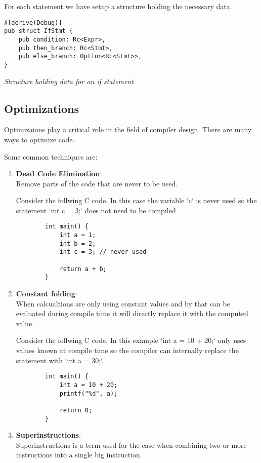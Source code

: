 \documentclass{article}
\begin{document}
For each statement we have setup a structure holding the necessary data.

\begin{verbatim}
#[derive(Debug)]
pub struct IfStmt {
    pub condition: Rc<Expr>,
    pub then_branch: Rc<Stmt>,
    pub else_branch: Option<Rc<Stmt>>,
}
\end{verbatim}
\textit{Structure holding data for an if statement}


\subsection{Optimizations} %
Optimizaions play a critical role in the field of compiler design. There are many
ways to optimize code.

Some common techniques are:
\begin{enumerate}
    \item \textbf{Dead Code Elimination}:\\
        Remove parts of the code that are never to be used.

        Consider the follwing C code. In this case the variable `c` is never
        used so the statement `int c = 3;` does not need to be compiled
        \begin{verbatim}
        int main() {
            int a = 1;
            int b = 2;
            int c = 3; // never used

            return a + b;
        }
        \end{verbatim}
    \item \textbf{Constant folding}:\\
        When calcualtions are only using constant values and by that can be
        evaluated during compile time it will directly replace it with the
        computed value.

        Consider the follwing C code. In this example `int a = 10 + 20;` only uses values known
        at compile time so the compiler can internally replace the statement with `int a = 30;`.
        \begin{verbatim}
        int main() {
            int a = 10 + 20;
            printf("%d", a);

            return 0;
        }
        \end{verbatim}
    \item \textbf{Superinstructions}:\\
        Superinstructions is a term used for the case when combining two or more instructions 
        into a single big instruction.


\end{enumerate}
\end{document}
